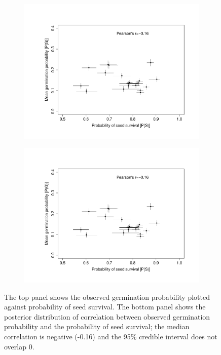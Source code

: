 \documentclass[12pt, oneside, titlepage]{article}   	%
\begin{document}
 
 \begin{figure}
\centering
\begin{subfigure}[h]{.65\textwidth}
\centering
       \includegraphics[page=1,width=1\textwidth]{../figures/germ_surv_correlation.pdf}  
\end{subfigure}
\begin{subfigure}[h]{.9\textwidth}
\centering
       \includegraphics[page=2,width=1\textwidth]{../figures/germ_surv_correlation.pdf}  
\end{subfigure}
 \caption{ The top panel shows the observed germination probability plotted against probability of seed survival. The bottom panel shows the posterior distribution of correlation between observed germination probability and the probability of seed survival; the median correlation is negative (-0.16) and the 95\% credible interval does not overlap 0. }
  \label{fig:germ_surv_correlation}
 \end{figure}
 
\end{document}
